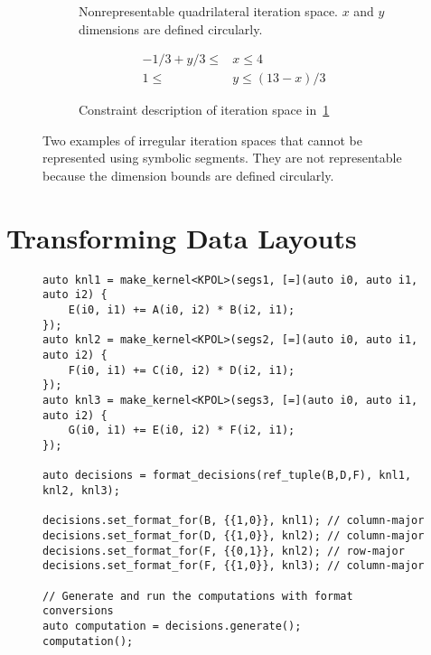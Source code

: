 \begin{figure}
\begin{subfigure}{0.5\columnwidth}
\caption{Nonrepresentable quadrilateral iteration space. $x$ and $y$ dimensions are defined circularly.}\label{trapezoidIterationSpace2}
\end{subfigure}
\begin{subfigure}{0.5\columnwidth}
\begin{align}
	-1/3 + y/3 \leq &x \leq 4 \\
	1 \leq &y \leq (13-x) / 3
\end{align}
\caption{Constraint description of iteration space in~\ref{trapezoidIterationSpace2}}\label{trapezoidConstraint2}
\end{subfigure}

\caption{Two examples of irregular iteration spaces that cannot be represented using symbolic segments. They are not representable because the dimension bounds are defined circularly.}\label{badShapes}
\end{figure}

\section{Transforming Data Layouts}

\begin{figure}
\begin{lstlisting}[caption={Changing data layouts for three Views in the \textsc{3mm} benchmark using \FormatDecisions.},
	label={FormatDecisions3MM}]
auto knl1 = make_kernel<KPOL>(segs1, [=](auto i0, auto i1, auto i2) {
	E(i0, i1) += A(i0, i2) * B(i2, i1);
});
auto knl2 = make_kernel<KPOL>(segs2, [=](auto i0, auto i1, auto i2) {
	F(i0, i1) += C(i0, i2) * D(i2, i1);
});
auto knl3 = make_kernel<KPOL>(segs3, [=](auto i0, auto i1, auto i2) {
	G(i0, i1) += E(i0, i2) * F(i2, i1);
});

auto decisions = format_decisions(ref_tuple(B,D,F), knl1, knl2, knl3);

decisions.set_format_for(B, {{1,0}}, knl1); // column-major
decisions.set_format_for(D, {{1,0}}, knl2); // column-major
decisions.set_format_for(F, {{0,1}}, knl2); // row-major
decisions.set_format_for(F, {{1,0}}, knl3); // column-major

// Generate and run the computations with format conversions
auto computation = decisions.generate();
computation();
\end{lstlisting}
\end{figure}

